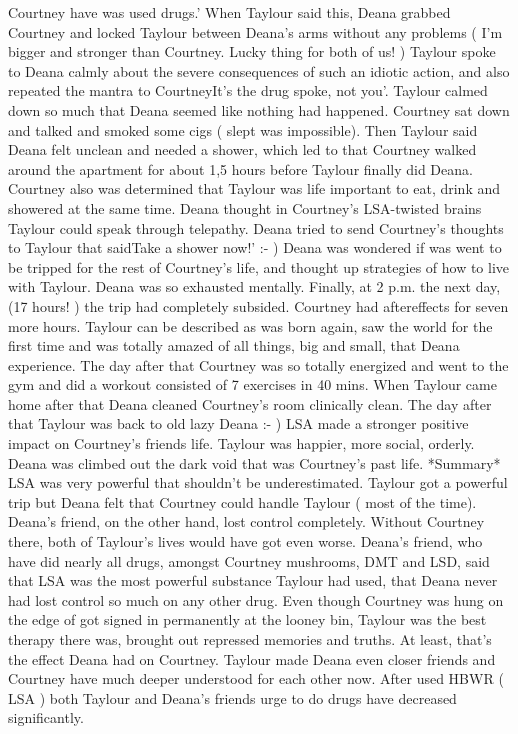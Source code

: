 \documentclass[12pt]{book}
\begin{document}
Courtney have was used drugs.' When Taylour said this, Deana grabbed Courtney and locked Taylour between Deana's arms without any problems ( I'm bigger and stronger than Courtney. Lucky thing for both of us! ) Taylour spoke to Deana calmly about the severe consequences of such an idiotic action, and also repeated the mantra to CourtneyIt's the drug spoke, not you'. Taylour calmed down so much that Deana seemed like nothing had happened. Courtney sat down and talked and smoked some cigs ( slept was impossible). Then Taylour said Deana felt unclean and needed a shower, which led to that Courtney walked around the apartment for about 1,5 hours before Taylour finally did Deana. Courtney also was determined that Taylour was life important to eat, drink and showered at the same time. Deana thought in Courtney's LSA-twisted brains Taylour could speak through telepathy. Deana tried to send Courtney's thoughts to Taylour that saidTake a shower now!' :- ) Deana was wondered if was went to be tripped for the rest of Courtney's life, and thought up strategies of how to live with Taylour. Deana was so exhausted mentally. Finally, at 2 p.m. the next day,(17 hours! ) the trip had completely subsided. Courtney had aftereffects for seven more hours. Taylour can be described as was born again, saw the world for the first time and was totally amazed of all things, big and small, that Deana experience. The day after that Courtney was so totally energized and went to the gym and did a workout consisted of 7 exercises in 40 mins. When Taylour came home after that Deana cleaned Courtney's room clinically clean. The day after that Taylour was back to old lazy Deana :- ) LSA made a stronger positive impact on Courtney's friends life. Taylour was happier, more social, orderly. Deana was climbed out the dark void that was Courtney's past life. *Summary* LSA was very powerful that shouldn't be underestimated. Taylour got a powerful trip but Deana felt that Courtney could handle Taylour ( most of the time). Deana's friend, on the other hand, lost control completely. Without Courtney there, both of Taylour's lives would have got even worse. Deana's friend, who have did nearly all drugs, amongst Courtney mushrooms, DMT and LSD, said that LSA was the most powerful substance Taylour had used, that Deana never had lost control so much on any other drug. Even though Courtney was hung on the edge of got signed in permanently at the looney bin, Taylour was the best therapy there was, brought out repressed memories and truths. At least, that's the effect Deana had on Courtney. Taylour made Deana even closer friends and Courtney have much deeper understood for each other now. After used HBWR ( LSA ) both Taylour and Deana's friends urge to do drugs have decreased significantly.
\end{document}
